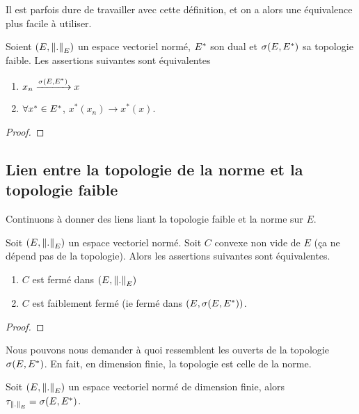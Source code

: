 Il est parfois dure de travailler avec cette définition, et on a alors une
équivalence plus facile à utiliser.

\begin{proposition}
	Soient $(E, \norm{.}_{E})$ un espace vectoriel normé, $E^{*}$ son dual et
	$\sigma(E, E^{*})$ sa topologie faible.
	Les assertions suivantes sont équivalentes
	\begin{enumerate}
		\item $x_{n} \xrightarrow{\sigma(E, E^{*})} x$
		\item $\forall x^{*} \in E^{*}$, $x^{*}(x_{n}) \rightarrow x^{*}(x)$.
	\end{enumerate}
\end{proposition}

\ifdefined\outputproof
\begin{proof}

\end{proof}
\fi

\subsection{Lien entre la topologie de la norme et la topologie faible}

Continuons à donner des liens liant la topologie faible et la norme sur $E$.

\begin{proposition}
	Soit $(E, \norm{.}_{E})$ un espace vectoriel normé.
	Soit $C$ convexe non vide de $E$ (ça ne dépend pas de la topologie).
	Alors les assertions suivantes sont équivalentes.
	\begin{enumerate}
		\item $C$ est fermé dans $(E, \norm{.}_{E})$
		\item $C$ est faiblement fermé (ie fermé dans $(E, \sigma(E, E^{*}))$.
	\end{enumerate}
\end{proposition}

\ifdefined\outputproof
\begin{proof}

\end{proof}
\fi

Nous pouvons nous demander à quoi ressemblent les ouverts de la topologie
$\sigma(E, E^{*})$. En fait, en dimension finie, la topologie est celle de la norme.

\begin{proposition}
	Soit $(E, \norm{.}_{E})$ un espace vectoriel normé de
	dimension finie, alors $\tau_{\norm{.}_{E}} = \sigma(E, E^{*})$.
\end{proposition}

